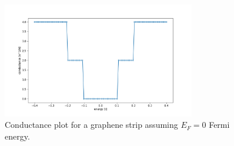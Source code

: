 \documentclass[12pt]{article}
\numberwithin{equation}{section}
\begin{document}
\newpage
\begin{figure}[h!]
  \begin{center}
  \includegraphics[width=0.75\textwidth]{Graphene_conductance_w22_l14.png}
  \caption{Conductance plot for a graphene strip assuming $E_F=0$ Fermi energy.}
  \label{fig:qwire}
  \end{center}
\end{figure}


\end{document}
